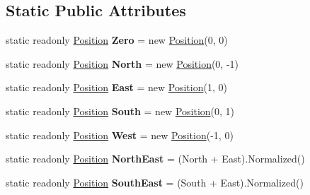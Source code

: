 \subsection*{Static Public Attributes}
\begin{DoxyCompactItemize}
\item 
\mbox{\label{struct_n_g_a_p_i_1_1_position_a4d5b7876c7196f6f301e0f96598277c9}} 
static readonly \hyperlink{struct_n_g_a_p_i_1_1_position}{Position} {\bfseries Zero} = new \hyperlink{struct_n_g_a_p_i_1_1_position}{Position}(0, 0)
\item 
\mbox{\label{struct_n_g_a_p_i_1_1_position_a0c1938b6e1ceef65922ad4ea222008f4}} 
static readonly \hyperlink{struct_n_g_a_p_i_1_1_position}{Position} {\bfseries North} = new \hyperlink{struct_n_g_a_p_i_1_1_position}{Position}(0, -\/1)
\item 
\mbox{\label{struct_n_g_a_p_i_1_1_position_a9f1da36607ceb8120db44c8702d2d31b}} 
static readonly \hyperlink{struct_n_g_a_p_i_1_1_position}{Position} {\bfseries East} = new \hyperlink{struct_n_g_a_p_i_1_1_position}{Position}(1, 0)
\item 
\mbox{\label{struct_n_g_a_p_i_1_1_position_aca7bff9f6da0e23a88dc6b7fa1ee5f55}} 
static readonly \hyperlink{struct_n_g_a_p_i_1_1_position}{Position} {\bfseries South} = new \hyperlink{struct_n_g_a_p_i_1_1_position}{Position}(0, 1)
\item 
\mbox{\label{struct_n_g_a_p_i_1_1_position_a3785ee324accb05f3474a00ea0777673}} 
static readonly \hyperlink{struct_n_g_a_p_i_1_1_position}{Position} {\bfseries West} = new \hyperlink{struct_n_g_a_p_i_1_1_position}{Position}(-\/1, 0)
\item 
\mbox{\label{struct_n_g_a_p_i_1_1_position_ad9182e812e0d9d6e7cedaf05d7709db6}} 
static readonly \hyperlink{struct_n_g_a_p_i_1_1_position}{Position} {\bfseries North\+East} = (North + East).Normalized()
\item 
\mbox{\label{struct_n_g_a_p_i_1_1_position_aad00fe719246f168670ccaa4b2d77934}} 
static readonly \hyperlink{struct_n_g_a_p_i_1_1_position}{Position} {\bfseries South\+East} = (South + East).Normalized()

\end{DoxyCompactItemize}
